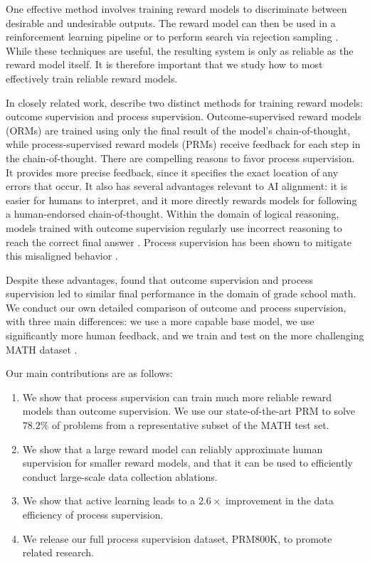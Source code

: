 \documentclass{article}
\begin{document}
One effective method involves training reward models to discriminate between desirable and undesirable outputs. The reward model can then be used in a reinforcement learning pipeline \citep{ziegler2019fine, stiennon2020learning, nakano2021webgpt, ouyang2022training} or to perform search via rejection sampling \citep{nichols2020collaborative, shen2021generate, cobbe2021training}. While these techniques are useful, the resulting system is only as reliable as the reward model itself. It is therefore important that we study how to most effectively train reliable reward models.

In closely related work, \cite{uesato2022solving} describe two distinct methods for training reward models: outcome supervision and process supervision. Outcome-supervised reward models (ORMs) are trained using only the final result of the model's chain-of-thought, while process-supervised reward models (PRMs) receive feedback for each step in the chain-of-thought. There are compelling reasons to favor process supervision. It provides more precise feedback, since it specifies the exact location of any errors that occur. It also has several advantages relevant to AI alignment: it is easier for humans to interpret, and it more directly rewards models for following a human-endorsed chain-of-thought. Within the domain of logical reasoning, models trained with outcome supervision regularly use incorrect reasoning to reach the correct final answer \citep{zelikman2022star, creswell2022selection}. Process supervision has been shown to mitigate this misaligned behavior \citep{uesato2022solving}.

Despite these advantages, \cite{uesato2022solving} found that outcome supervision and process supervision led to similar final performance in the domain of grade school math. We conduct our own detailed comparison of outcome and process supervision, with three main differences: we use a more capable base model, we use significantly more human feedback, and we train and test on the more challenging MATH dataset \citep{hendrycks2021measuring}.

Our main contributions are as follows:

\begin{enumerate}
\item We show that process supervision can train much more reliable reward models than outcome supervision. We use our state-of-the-art PRM to solve $78.2\%$ of problems from a representative subset of the MATH test set.

\item We show that a large reward model can reliably approximate human supervision for smaller reward models, and that it can be used to efficiently conduct large-scale data collection ablations.

\item We show that active learning leads to a $2.6\times$ improvement in the data efficiency of process supervision.

\item We release our full process supervision dataset, PRM800K, to promote related research.

\end{enumerate}
\end{document}
